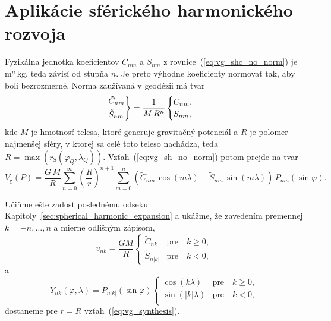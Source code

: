 \documentclass[a4paper, 12pt]{book}
\newcommand{\gidx}{\mathrm g}
\begin{document}
\section{Aplikácie sférického harmonického rozvoja}
\label{sec:spherical_harmonics_applications}

Fyzikálna jednotka koeficientov $C_{nm}$ a $S_{nm}$ 
z rovnice~(\ref{eq:vg_shc_no_norm}) je $\mathrm{m}^n \, \mathrm{kg}$, teda 
závisí od stupňa $n$.  Je preto výhodne koeficienty normovať tak, aby boli 
bezrozmerné.  Norma zaužívaná v geodézii má tvar
%
\begin{equation}
\begin{rcases}
\tilde{C}_{nm}\\
\tilde{S}_{nm}
\end{rcases}
= \frac{1}{M \, R^n}
\begin{cases}
C_{nm}{,}\\
S_{nm}{,}
\end{cases}
\end{equation}
%
kde $M$ je hmotnosť telesa, ktoré generuje gravitačný potenciál a $R$ je 
polomer najmenšej sféry, v ktorej sa celé toto teleso nachádza, teda $R 
= \max(r_\mathrm{S}(\varphi_Q, \lambda_Q))$.  Vzťah~(\ref{eq:vg_sh_no_norm}) 
potom prejde na tvar
%
\begin{equation}
\label{eq:vg_sh_1st_norm}
V_\gidx(P) = \frac{G \, M}{R} \sum_{n = 0}^\infty \left( \frac{R}{r} \right)^{n 
+ 1} \sum_{m = 0}^{n} \left( \tilde{C}_{nm} \, \cos(m\lambda) + \tilde{S}_{nm} 
\, \sin(m\lambda)\right) \, P_{nm}(\sin\varphi){.}
\end{equation}


Učiňme ešte zadosť poslednému odseku 
Kapitoly~\ref{sec:spherical_harmonic_expansion} a ukážme, že zavedením 
premennej $k = -n, \dots, n$ a mierne odlišným zápisom,
%
\begin{equation}
v_{nk} = \frac{GM}{R}
%
\begin{cases}
\tilde{C}_{nk}   & \text{pre} \quad k \geq 0{,}\\
\tilde{S}_{n|k|} & \text{pre} \quad k < 0{,}
\end{cases}
\end{equation}
%
a
%
\begin{equation}
Y_{nk}(\varphi, \lambda) = P_{n|k|}(\sin\varphi)
%
\begin{cases}
\cos(k\lambda)    &\text{pre} \quad k \geq 0{,}\\
\sin(|k|\lambda)  &\text{pre} \quad k < 0{,}\\
\end{cases}
\end{equation}
%
dostaneme pre $r = R$ vzťah~(\ref{eq:vg_synthesis}).
\end{document}
